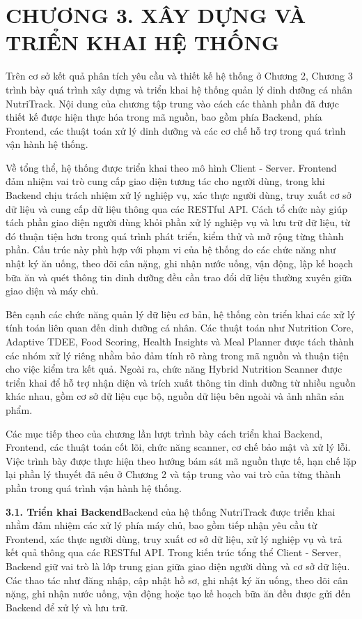 \chapter*{CHƯƠNG 3. XÂY DỰNG VÀ TRIỂN KHAI HỆ THỐNG}
Trên cơ sở kết quả phân tích yêu cầu và thiết kế hệ thống ở Chương 2, Chương 3 trình bày quá trình xây dựng và triển khai hệ thống quản lý dinh dưỡng cá nhân NutriTrack. Nội dung của chương tập trung vào cách các thành phần đã được thiết kế được hiện thực hóa trong mã nguồn, bao gồm phía Backend, phía Frontend, các thuật toán xử lý dinh dưỡng và các cơ chế hỗ trợ trong quá trình vận hành hệ thống.

Về tổng thể, hệ thống được triển khai theo mô hình Client - Server. Frontend đảm nhiệm vai trò cung cấp giao diện tương tác cho người dùng, trong khi Backend chịu trách nhiệm xử lý nghiệp vụ, xác thực người dùng, truy xuất cơ sở dữ liệu và cung cấp dữ liệu thông qua các RESTful API. Cách tổ chức này giúp tách phần giao diện người dùng khỏi phần xử lý nghiệp vụ và lưu trữ dữ liệu, từ đó thuận tiện hơn trong quá trình phát triển, kiểm thử và mở rộng từng thành phần. Cấu trúc này phù hợp với phạm vi của hệ thống do các chức năng như nhật ký ăn uống, theo dõi cân nặng, ghi nhận nước uống, vận động, lập kế hoạch bữa ăn và quét thông tin dinh dưỡng đều cần trao đổi dữ liệu thường xuyên giữa giao diện và máy chủ.

Bên cạnh các chức năng quản lý dữ liệu cơ bản, hệ thống còn triển khai các xử lý tính toán liên quan đến dinh dưỡng cá nhân. Các thuật toán như Nutrition Core, Adaptive TDEE, Food Scoring, Health Insights và Meal Planner được tách thành các nhóm xử lý riêng nhằm bảo đảm tính rõ ràng trong mã nguồn và thuận tiện cho việc kiểm tra kết quả. Ngoài ra, chức năng Hybrid Nutrition Scanner được triển khai để hỗ trợ nhận diện và trích xuất thông tin dinh dưỡng từ nhiều nguồn khác nhau, gồm cơ sở dữ liệu cục bộ, nguồn dữ liệu bên ngoài và ảnh nhãn sản phẩm.

Các mục tiếp theo của chương lần lượt trình bày cách triển khai Backend, Frontend, các thuật toán cốt lõi, chức năng scanner, cơ chế bảo mật và xử lý lỗi. Việc trình bày được thực hiện theo hướng bám sát mã nguồn thực tế, hạn chế lặp lại phần lý thuyết đã nêu ở Chương 2 và tập trung vào vai trò của từng thành phần trong quá trình vận hành hệ thống.

\textbf{3.1. Triển khai Backend}Backend của hệ thống NutriTrack được triển khai nhằm đảm nhiệm các xử lý phía máy chủ, bao gồm tiếp nhận yêu cầu từ Frontend, xác thực người dùng, truy xuất cơ sở dữ liệu, xử lý nghiệp vụ và trả kết quả thông qua các RESTful API. Trong kiến trúc tổng thể Client - Server, Backend giữ vai trò là lớp trung gian giữa giao diện người dùng và cơ sở dữ liệu. Các thao tác như đăng nhập, cập nhật hồ sơ, ghi nhật ký ăn uống, theo dõi cân nặng, ghi nhận nước uống, vận động hoặc tạo kế hoạch bữa ăn đều được gửi đến Backend để xử lý và lưu trữ.


